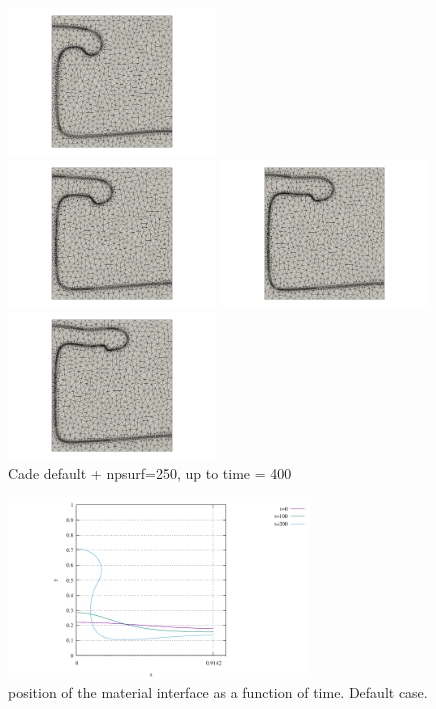 \begin{center}
\includegraphics[width=5.5cm]{python_codes/fieldstone_95/results/npsurf250/grid0250.png}\\
\includegraphics[width=5.5cm]{python_codes/fieldstone_95/results/npsurf250/grid0300.png}
\includegraphics[width=5.5cm]{python_codes/fieldstone_95/results/npsurf250/grid0350.png}
\includegraphics[width=5.5cm]{python_codes/fieldstone_95/results/npsurf250/grid0400.png}\\
{\captionfont Cade default + npsurf=250, up to time = 400}
\end{center}


\begin{center}
\includegraphics[width=8cm]{python_codes/fieldstone_95/results/interface.pdf}\\
{\captionfont position of the material interface as a function of time. Default case.}
\end{center}


